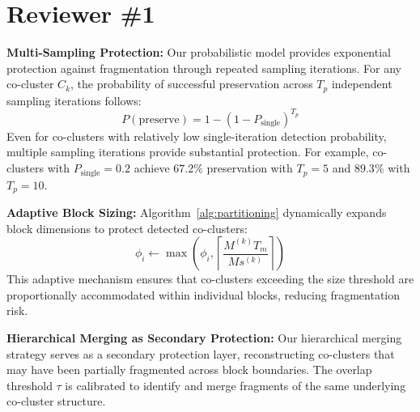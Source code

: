 \documentclass{ar2rc}
\begin{document}

\section{Reviewer \#1}



\textbf{Multi-Sampling Protection:} Our probabilistic model provides exponential protection against fragmentation through repeated sampling iterations. For any co-cluster $C_k$, the probability of successful preservation across $T_p$ independent sampling iterations follows:
\begin{equation}
  P(\text{preserve}) = 1 - \left(1 - P_{\text{single}}\right)^{T_p}
\end{equation}
Even for co-clusters with relatively low single-iteration detection probability, multiple sampling iterations provide substantial protection. For example, co-clusters with $P_{\text{single}} = 0.2$ achieve $67.2\%$ preservation with $T_p = 5$ and $89.3\%$ with $T_p = 10$.

\textbf{Adaptive Block Sizing:} Algorithm~\ref{alg:partitioning} dynamically expands block dimensions to protect detected co-clusters:
\begin{equation}
  \phi_i \leftarrow \max\left(\phi_i, \left\lceil\frac{M^{(k)}T_m}{Ms^{(k)}}\right\rceil\right)
\end{equation}
This adaptive mechanism ensures that co-clusters exceeding the size threshold are proportionally accommodated within individual blocks, reducing fragmentation risk.

\textbf{Hierarchical Merging as Secondary Protection:} Our hierarchical merging strategy serves as a secondary protection layer, reconstructing co-clusters that may have been partially fragmented across block boundaries. The overlap threshold $\tau$ is calibrated to identify and merge fragments of the same underlying co-cluster structure.
\end{document}
